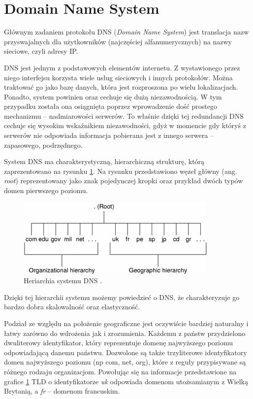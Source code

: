 \section{Domain Name System}
Głównym zadaniem protokołu DNS (\textit{Domain Name System}) \cite{RFC1035} jest translacja nazw przyswajalnych dla użytkowników (najczęściej
alfanumerycznych) na nazwy sieciowe, czyli adresy IP.

DNS jest jednym z podstawowych elementów internetu. Z wystawionego przez niego interfejsu korzysta wiele usług sieciowych i innych
protokołów. Można traktować go jako bazę danych, która jest rozproszona po wielu lokalizacjach. Ponadto, system powinien oraz
cechuje się dużą niezawodnością. W tym przypadku została ona osiągnięta poprzez wprowadzenie dość prostego mechanizmu -- nadmiarowości
serwerów. To właśnie dzięki tej redundancji DNS cechuje się wysokim wskaźnikiem niezawodności, gdyż w momencie gdy któryś z serwerów
nie odpowiada informacja pobierana jest z innego serwera -- zapasowego, podrzędnego.

System DNS ma charakterystyczną, hierarchiczną strukturę, którą zaprezentowano na rysunku \ref{hierarchy_dns}. Na rysunku
przedstawiono węzeł główny (ang. \textit{root}) reprezentowany jako znak pojedynczej kropki oraz przykład dwóch typów domen
pierwszego poziomu.

\begin{center}
	\begin{figure}
	\includegraphics[scale=1]{image/hierarchy_dns}
	\caption{Heriarchia systemu DNS \cite{hierarchy_dns}.}
	\label{hierarchy_dns}
	\end{figure}
\end{center}

Dzięki tej hierarchii systemu możemy powiedzieć o DNS, że charakteryzuje go bardzo dobra skalowalność oraz elastyczność.

Podział ze względu na położenie geograficzne jest oczywiście bardziej naturalny i łatwy zarówno do wdrożenia jak i zrozumienia.
Każdemu z państw przydzielono dwuliterowy identyfikator, który reprezentuje domenę najwyższego poziomu odpowiadającą
danemu państwu. Dozwolone są także trzyliterowe identyfikatory domen najwyższego poziomu (np com, net, org), które z reguły
przypisywane są różnego rodzaju organizacjom. Powołując się na informacje przedstawione na grafice \ref{hierarchy_dns}
TLD o identyfikatorze \textit{uk} odpowiada domenom utożsamianym z Wielką Brytanią, a \textit{fr} -- domenom francuskim.

